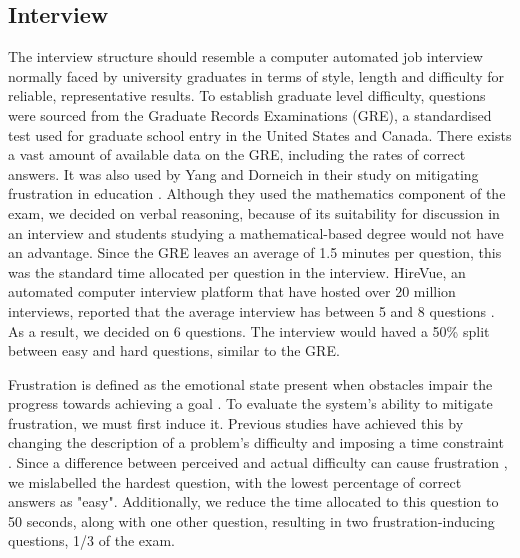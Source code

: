 \documentclass[12pt,a4paper]{article}
\begin{document}
\subsection*{Interview}
The interview structure should resemble a computer automated job interview normally faced by university graduates in terms of style, length and difficulty for reliable, representative results. To establish graduate level difficulty, questions were sourced from the Graduate Records Examinations (GRE), a standardised test used for graduate school entry in the United States and Canada. There exists a vast amount of available data on the GRE, including the rates of correct answers. It was also used by Yang and Dorneich in their study on mitigating frustration in education \cite{yang2018evaluating}.  Although they used the mathematics component of the exam, we decided on verbal reasoning, because of its suitability for discussion in an interview and students studying a mathematical-based degree would not have an advantage. Since the GRE leaves an average of 1.5 minutes per question, this was the standard time allocated per question in the interview. HireVue, an automated computer interview platform that have hosted over 20 million interviews, reported that the average interview has between 5 and 8 questions \cite{WhyUseaV18:online}. As a result, we decided on 6 questions. The interview would haved a 50\% split between easy and hard questions, similar to the GRE.

Frustration is defined as the emotional state present when obstacles impair the progress towards achieving a goal \cite{lawson1965frustration}. To evaluate the system's ability to mitigate frustration, we must first induce it. Previous studies have achieved this by changing the description of a problem's difficulty and imposing a time constraint \cite{yang2018evaluating}. Since a difference between perceived and actual difficulty can cause frustration \cite{hone2006empathic}, we mislabelled the hardest question, with the lowest percentage of correct answers as "easy". Additionally, we reduce the time allocated to this question to 50 seconds, along with one other question, resulting in two frustration-inducing questions, 1/3 of the exam.
\end{document}

